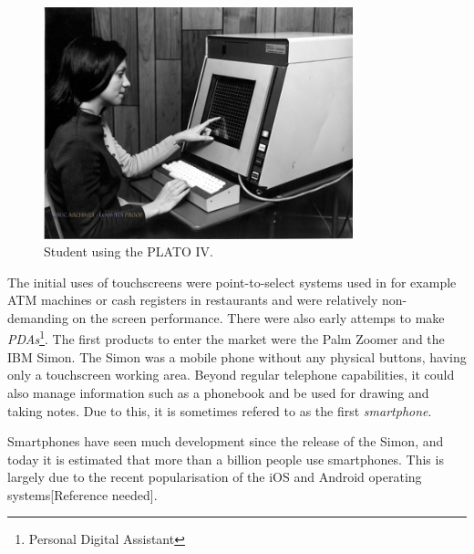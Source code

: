 \begin{figure}[]
\includegraphics[width=0.8\textwidth] {bilder/platoiv.jpg}
\caption{Student using the PLATO IV.}
\label{platoIV}
\end{figure}
\nocite{platoiv}


The initial uses of touchscreens were point-to-select systems used in for example ATM machines or cash registers in restaurants and were relatively non-demanding on the screen performance\cite{buxton}. There were also early attemps to make \emph{PDAs}\footnote{Personal Digital Assistant}. The first products to enter the market were the Palm Zoomer and the IBM Simon. The Simon was a mobile phone without any physical buttons, having only a touchscreen working area. Beyond regular telephone capabilities, it could also manage information such as a phonebook and be used for drawing and taking notes. Due to this, it is sometimes refered to as the first \emph{smartphone}\cite{buxton}.

Smartphones have seen much development since the release of the Simon, and today it is estimated that more than a billion people use smartphones\cite{billion1}\cite{billion2}. This is largely due to the recent popularisation of the iOS and Android operating systems[Reference needed]. 

